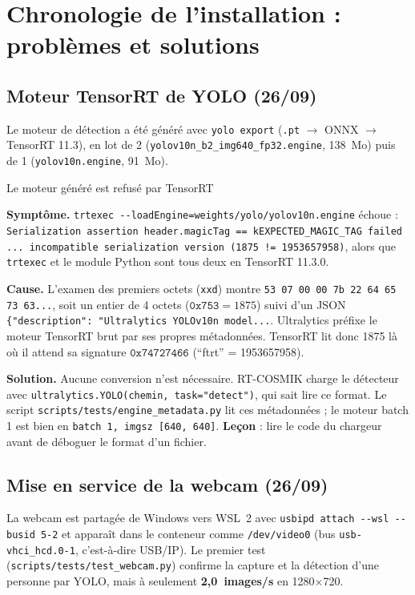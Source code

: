 \documentclass[11pt,a4paper]{article}
\newcommand{\symptome}[1]{\par\noindent\textbf{Symptôme.} #1}
\newcommand{\cause}[1]{\par\smallskip\noindent\textbf{Cause.} #1}
\newcommand{\solution}[1]{\par\smallskip\noindent\textbf{Solution.} #1}
\newcommand{\code}[1]{\texttt{\small #1}}
\begin{document}
\section{Chronologie de l'installation : problèmes et solutions}

\subsection{Moteur TensorRT de YOLO (26/09)}

Le moteur de détection a été généré avec \code{yolo export} (\code{.pt} $\rightarrow$ ONNX $\rightarrow$ TensorRT 11.3), en lot de 2 (\code{yolov10n\_b2\_img640\_fp32.engine}, 138~Mo) puis de 1 (\code{yolov10n.engine}, 91~Mo).

\begin{probleme}{Le moteur généré est refusé par TensorRT}
\symptome{\code{trtexec -{}-loadEngine=weights/yolo/yolov10n.engine} échoue : \code{Serialization assertion header.magicTag == kEXPECTED\_MAGIC\_TAG failed ... incompatible serialization version (1875 != 1953657958)}, alors que \code{trtexec} et le module Python sont tous deux en TensorRT 11.3.0.}
\cause{L'examen des premiers octets (\code{xxd}) montre \code{53 07 00 00 7b 22 64 65 73 63...}, soit un entier de 4 octets ($\mathtt{0x753} = 1875$) suivi d'un JSON \code{\{"description": "Ultralytics YOLOv10n model...}. Ultralytics préfixe le moteur TensorRT brut par ses propres métadonnées. TensorRT lit donc 1875 là où il attend sa signature $\mathtt{0x74727466}$ (\enquote{ftrt} = 1953657958).}
\solution{Aucune conversion n'est nécessaire. RT-COSMIK charge le détecteur avec \code{ultralytics.YOLO(chemin, task="detect")}, qui sait lire ce format. Le script \code{scripts/tests/engine\_metadata.py} lit ces métadonnées ; le moteur batch 1 est bien en \code{batch 1, imgsz [640, 640]}. \textbf{Leçon} : lire le code du chargeur avant de déboguer le format d'un fichier.}
\end{probleme}

\subsection{Mise en service de la webcam (26/09)}

La webcam est partagée de Windows vers WSL~2 avec \code{usbipd attach -{}-wsl -{}-busid 5-2} et apparaît dans le conteneur comme \code{/dev/video0} (bus \code{usb-vhci\_hcd.0-1}, c'est-à-dire USB/IP). Le premier test (\code{scripts/tests/test\_webcam.py}) confirme la capture et la détection d'une personne par YOLO, mais à seulement \textbf{2,0~images/s} en 1280$\times$720.
\end{document}
